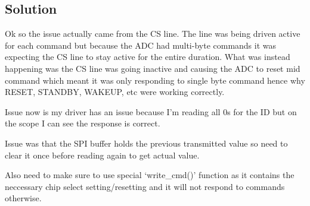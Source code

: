 \subsection{Solution}
Ok so the issue actually came from the CS line. The line was being driven active for each
command but because the ADC had multi-byte commands it was expecting the CS line to stay
active for the entire duration.
What was instead happening was the CS line was going inactive
and causing the ADC to reset mid command which meant it was only responding to single byte
command hence why RESET, STANDBY, WAKEUP, etc were working correctly.

Issue now is my driver has an issue because I'm reading all 0s for the
ID but on the scope I can see the response is correct.

Issue was that the SPI buffer holds the previous transmitted value so need to clear it once
before reading again to get actual value.

Also need to make sure to use special `write\_cmd()' function as it contains the neccessary
chip select setting/resetting and it will not respond to commands otherwise.
